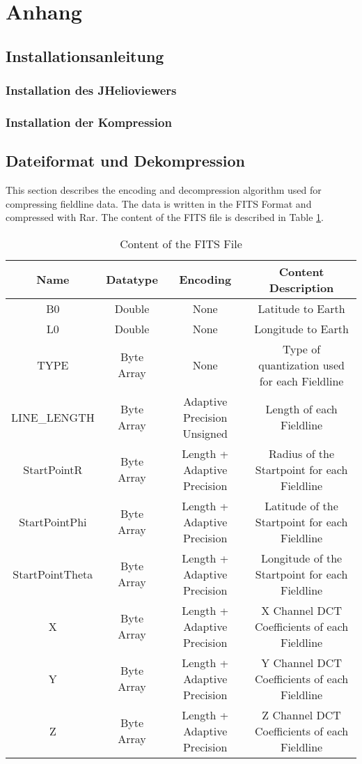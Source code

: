 \section{Anhang}
\subsection{Installationsanleitung}
\subsubsection{Installation des JHelioviewers}
\subsubsection{Installation der Kompression}
\pagebreak

\subsection{Dateiformat und Dekompression}
This section describes the encoding and decompression algorithm used for compressing fieldline data. The data is written in the FITS Format \cite{website:fits} and compressed with Rar. The content of the FITS file is described in Table \ref{anhang:format:content}.\\
\begin{table}[!htbp]
\center
\begin{tabular}{|c|c|c|c|}
	\hline
	Name  & Datatype & Encoding& Content Description	\\\hline
    B0 & Double & None & Latitude to Earth\\
    L0 & Double& None& Longitude to Earth\\
    TYPE & Byte Array & None & Type of quantization used for each Fieldline\\
    LINE\_LENGTH &Byte Array & Adaptive Precision Unsigned & Length of each Fieldline\\
    StartPointR & Byte Array & Length + Adaptive Precision & Radius of the Startpoint for each Fieldline\\
    StartPointPhi & Byte Array & Length + Adaptive Precision & Latitude of the Startpoint for each Fieldline\\
    StartPointTheta & Byte Array & Length  + Adaptive Precision & Longitude of the Startpoint for each Fieldline\\
    X & Byte Array & Length + Adaptive Precision & X Channel DCT Coefficients of each Fieldline\\
    Y & Byte Array & Length + Adaptive Precision & Y Channel DCT Coefficients of each Fieldline\\
    Z & Byte Array & Length + Adaptive Precision & Z Channel DCT Coefficients of each Fieldline\\\hline
\end{tabular}
\caption{Content of the FITS File}
\label{anhang:format:content}
\end{table}

